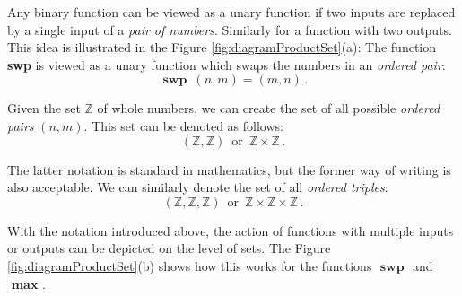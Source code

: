 Any binary function can be viewed as a unary function
if two inputs are replaced by a single input of a \emph{pair of
numbers}. Similarly for a function with two outputs. This idea is
illustrated in the Figure \ref{fig:diagramProductSet}(a): The function
{\bf swp} is viewed as a unary function which swaps the numbers in an
\emph{ordered pair}:
\[
\textbf{ swp }\,(n,m) = (m, n)\,.
\]

Given the set $\mathbb{Z}$ of whole numbers, we can create the set of
all possible \emph{ordered pairs} $(n,m)$. This set can be denoted as
follows:
\[
(\mathbb{Z}, \mathbb{Z})\,\textrm{ or }\, \mathbb{Z}\times\mathbb{Z}\,.
\]

The latter notation is standard in mathematics, but the former way
of writing is also acceptable. We can similarly denote the set of all
\emph{ordered triples}:
\[
(\mathbb{Z}, \mathbb{Z}, \mathbb{Z})\,\textrm{ or }\, \mathbb{Z}\times\mathbb{Z}\times\mathbb{Z}\,.
\]

With the notation introduced above, the action of functions with
multiple inputs or outputs can be depicted on the level of sets. The
 Figure \ref{fig:diagramProductSet}(b) shows how this works for the
 functions $\textbf{ swp }$ and $\textbf{ max }$.

